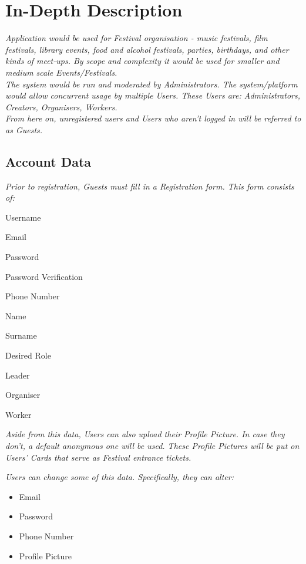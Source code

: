 \section{In-Depth Description}
\textit{Application would be used for Festival organisation - music festivals, film festivals, library events, food and alcohol festivals, parties, birthdays, and other kinds of meet-ups. By scope and complexity it would be used for smaller and medium scale Events/Festivals.}\\

\textit{The system would be run and moderated by Administrators. The system/platform would allow concurrent usage by multiple Users. These Users are: Administrators, Creators, Organisers, Workers.}\\

\textit{From here on, unregistered users and Users who aren't logged in will be referred to as Guests.}

	\subsection{Account Data}
	\textit{Prior to registration, Guests must fill in a Registration form. This form consists of: }
	\begin{packed_item}
		\item Username
		\item Email
		\item Password
		\item Password Verification
		\item Phone Number
		\item Name
		\item Surname
		\item Desired Role
		\begin{packed_enum}
			\item Leader
			\item Organiser
			\item Worker
		\end{packed_enum}
	\end{packed_item}

	\textit{Aside from this data, Users can also upload their Profile Picture. In case they don't, a default anonymous one will be used. These Profile Pictures will be put on Users' Cards that serve as Festival entrance tickets.}
	
	\textit{Users can change some of this data. Specifically, they can alter:}
	\begin{itemize}
		\item Email
		\item Password
		\item Phone Number
		\item Profile Picture
	\end{itemize}
	
